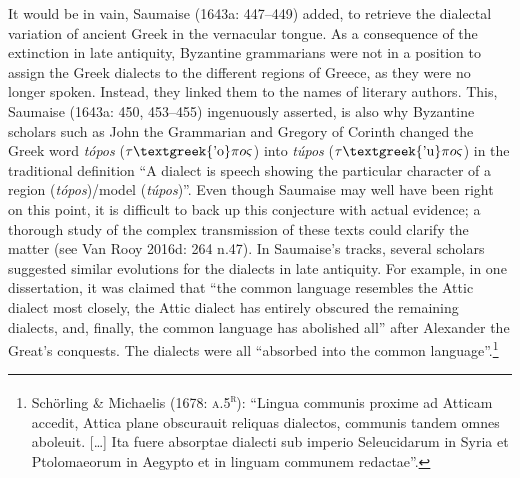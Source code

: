 \begin{styleStandard}
It would be in vain, Saumaise (1643a: 447–449) added, to retrieve the dialectal variation of ancient Greek in the vernacular tongue. As a consequence of the extinction in late antiquity, Byzantine grammarians were not in a position to assign the Greek dialects to the different regions of Greece, as they were no longer spoken. Instead, they linked them to the names of literary authors. This, Saumaise (1643a: 450, 453–455) ingenuously asserted, is also why Byzantine scholars such as John the Grammarian and Gregory of Corinth changed the Greek word \textit{tópos }($\tau \text{\textgreek{'o}}\pi o\varsigma $) into \textit{túpos} ($\tau \text{\textgreek{'u}}\pi o\varsigma $) in the traditional definition “A dialect is speech showing the particular character of a region (\textit{tópos})/model (\textit{túpos})”. Even though Saumaise may well have been right on this point, it is difficult to back up this conjecture with actual evidence; a thorough study of the complex transmission of these texts could clarify the matter (see Van Rooy 2016d: 264 n.47). In Saumaise’s tracks, several scholars suggested similar evolutions for the dialects in late antiquity. For example, in one dissertation, it was claimed that “the common language resembles the Attic dialect most closely, the Attic dialect has entirely obscured the remaining dialects, and, finally, the common language has abolished all” after Alexander the Great’s conquests. The dialects were all “absorbed into the common language”.\footnote{ Schörling \& Michaelis (1678: \textsc{a.5}\textsc{\textsuperscript{r}}): “Lingua communis proxime ad Atticam accedit, Attica plane obscurauit reliquas dialectos, communis tandem omnes aboleuit. […] Ita fuere absorptae dialecti sub imperio Seleucidarum in Syria et Ptolomaeorum in Aegypto et in linguam communem redactae”.}
\end{styleStandard}

